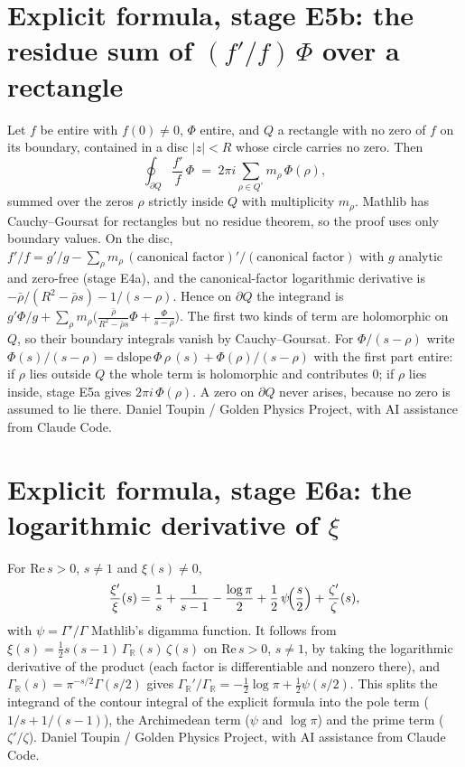 \documentclass{report}
\theoremstyle{definition}
\begin{document}
\begin{itemize}
\begin{itemize}
\section{Explicit formula, stage E5b: the residue sum of $(f'/f)\,\Phi$ over a rectangle}
Let $f$ be entire with $f(0)\ne0$, $\Phi$ entire, and $Q$ a rectangle with no zero of $f$ on its boundary, contained in a disc $|z|<R$ whose circle carries no zero. Then
\[
\oint_{\partial Q}\frac{f'}{f}\,\Phi\;=\;2\pi i\sum_{\rho\in Q^\circ}m_\rho\,\Phi(\rho),
\]
summed over the zeros $\rho$ strictly inside $Q$ with multiplicity $m_\rho$. Mathlib has Cauchy--Goursat for rectangles but no residue theorem, so the proof uses only boundary values. On the disc, $f'/f=g'/g-\sum_\rho m_\rho\,(\text{canonical factor})'/(\text{canonical factor})$ with $g$ analytic and zero-free (stage E4a), and the canonical-factor logarithmic derivative is $-\bar\rho/(R^2-\bar\rho s)-1/(s-\rho)$. Hence on $\partial Q$ the integrand is $g'\Phi/g+\sum_\rho m_\rho\bigl(\tfrac{\bar\rho}{R^2-\bar\rho s}\Phi+\tfrac{\Phi}{s-\rho}\bigr)$. The first two kinds of term are holomorphic on $Q$, so their boundary integrals vanish by Cauchy--Goursat. For $\Phi/(s-\rho)$ write $\Phi(s)/(s-\rho)=\mathrm{dslope}\,\Phi\,\rho\,(s)+\Phi(\rho)/(s-\rho)$ with the first part entire: if $\rho$ lies outside $Q$ the whole term is holomorphic and contributes $0$; if $\rho$ lies inside, stage E5a gives $2\pi i\,\Phi(\rho)$. A zero on $\partial Q$ never arises, because no zero is assumed to lie there.
Daniel Toupin / Golden Physics Project, with AI assistance from Claude Code.


\section{Explicit formula, stage E6a: the logarithmic derivative of $\xi$}
For $\mathrm{Re}\,s>0$, $s\ne1$ and $\xi(s)\ne0$,
\[
\frac{\xi'}{\xi}(s)=\frac1s+\frac1{s-1}-\frac{\log\pi}2+\frac12\,\psi\!\Bigl(\frac s2\Bigr)+\frac{\zeta'}{\zeta}(s),
\]
with $\psi=\Gamma'/\Gamma$ Mathlib's digamma function. It follows from $\xi(s)=\tfrac12s(s-1)\,\Gamma_{\mathbb R}(s)\,\zeta(s)$ on $\mathrm{Re}\,s>0$, $s\ne1$, by taking the logarithmic derivative of the product (each factor is differentiable and nonzero there), and $\Gamma_{\mathbb R}(s)=\pi^{-s/2}\Gamma(s/2)$ gives $\Gamma_{\mathbb R}'/\Gamma_{\mathbb R}=-\tfrac12\log\pi+\tfrac12\psi(s/2)$. This splits the integrand of the contour integral of the explicit formula into the pole term ($1/s+1/(s-1)$), the Archimedean term ($\psi$ and $\log\pi$) and the prime term ($\zeta'/\zeta$).
Daniel Toupin / Golden Physics Project, with AI assistance from Claude Code.



\end{itemize}
\end{itemize}
\end{document}
